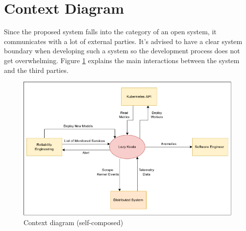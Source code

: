 \section{Context Diagram}

Since the proposed system falls into the category of an open system, it communicates with a lot of external parties. It's advised to have a clear system boundary when developing such a system so the development process does not get overwhelming. Figure \ref{fig:context-digram} explains the main interactions between the system and the third parties.

\begin{figure}[H]
   \includegraphics[width=12.5cm]{assets/requirement-specification/contex-digram.png}
    \caption{Context diagram (self-composed)}
    \label{fig:context-digram}
\end{figure}
